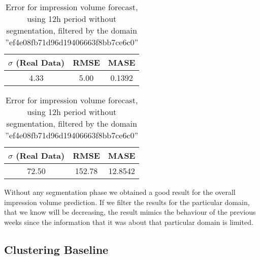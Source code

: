 \begin{table}[!ht]
\centering
\footnotesize
\begin{minipage}[t]{0.45\linewidth}
\centering
\footnotesize
\begin{tabular}{ccc}
 $\sigma$ (Real Data) & RMSE & MASE   \\ \hline
4.33 & 5.00 & 0.1392 \\
\end{tabular}

\vspace{0.5cm}

\caption[Volume
impression forecast, safari]{Error for impression volume
forecast, using 12h period without segmentation }
\label{tab:err_domain_wo_segmentation}
\end{minipage}
\quad
\begin{minipage}[t]{0.45\linewidth}
\centering
\footnotesize
\begin{tabular}{ccc}
 $\sigma$ (Real Data) & RMSE & MASE   \\ \hline
72.50 & 152.78 & 12.8542 \\
\end{tabular}

\vspace{0.5cm}

\caption[Volume
impression forecast, safari]{Error for impression volume
forecast, using 12h period without segmentation, filtered by the domain ''ef4e08fb71d96d19406663f8bb7ce6c0'' }
\label{tab:err_domain_wo_segmentation_filtered}
\end{minipage}

\end{table}

Without any segmentation phase we obtained a good result for the overall
impression volume prediction. If we filter the results for the particular
domain,
that we know will be decreasing, the result mimics the behaviour of the previous
weeks since the information that it was about that particular domain is limited.

\subsection*{Clustering Baseline}

